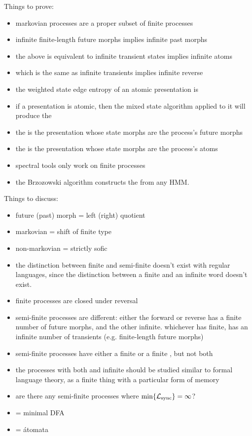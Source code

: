 \documentclass[prl,twocolumn,showpacs,superscriptaddress,preprintnumbers,floatfix]{revtex4-1}
\theoremstyle{plain}    \newtheorem{Lem}{Lemma}
\theoremstyle{plain}    \newtheorem*{ProLem}{Proof}
\theoremstyle{plain}    \newtheorem{Cor}{Corollary}
\theoremstyle{plain}    \newtheorem*{ProCor}{Proof}
\theoremstyle{plain}    \newtheorem{The}{Theorem}
\theoremstyle{plain}    \newtheorem*{ProThe}{Proof}
\theoremstyle{plain}    \newtheorem{Prop}{Proposition}
\theoremstyle{plain}    \newtheorem*{ProProp}{Proof}
\theoremstyle{plain}    \newtheorem*{Conj}{Conjecture}
\theoremstyle{plain}    \newtheorem*{Rem}{Remark}
\theoremstyle{plain}    \newtheorem{Def}{Definition}
\theoremstyle{plain}    \newtheorem*{Not}{Notation}
\begin{document}
Things to prove:
\begin{itemize}
  \item markovian processes are a proper subset of finite processes
  \item infinite finite-length future morphs implies infinite past morphs
  \item the above is equivalent to infinite transient states implies infinite
    atoms
  \item which is the same as infinite transients implies infinite reverse \eM
  \item the weighted state edge entropy of an atomic presentation is \hmu
  \item if a presentation is atomic, then the mixed state algorithm applied to
    it will produce the \eM
  \item the \eM is the presentation whose state morphs are the process's future
    morphs
  \item the \eT is the presentation whose state morphs are the process's atoms
  \item spectral tools only work on finite processes
  \item the Brzozowski algorithm constructs the \eM from any HMM.
\end{itemize}

Things to discuss:
\begin{itemize}
  \item future (past) morph = left (right) quotient
  \item markovian = shift of finite type
  \item non-markovian = strictly sofic
  \item the distinction between finite and semi-finite doesn't exist with
    regular languages, since the distinction between a finite and an infinite
    word doesn't exist.
  \item finite processes are closed under reversal
  \item semi-finite processes are different: either the forward or reverse has a
    finite number of future morphs, and the other infinite. whichever has
    finite, has an infinite number of transients (e.g. finite-length future morphs)
  \item semi-finite processes have either a finite \eM or a finite \eT, but not both
  \item the processes with both \eM and \eT infinite should be studied similar
    to formal language theory, as a finite thing with a particular form of
    memory
  \item are there any semi-finite processes where $\min\{\mathcal{L}_{\mathrm{sync}}\} = \infty$?
  \item \eM = minimal DFA
  \item \eT = \'{a}tomata
\end{itemize}
\end{document}

